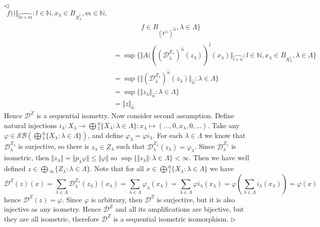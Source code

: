 \documentclass[12pt]{article}
\newenvironment{proof}{\par $\triangleleft$}{$\triangleright$}
\begin{document}
\begin{proof}
$$\begin{aligned}
                f
            )
        )
    \Vert_{\wideparen{l n\times m}}
    :l\in\mathbb{N},x_\lambda\in B_{X_\lambda^{\wideparen{l}}},m\in\mathbb{N},\\
    &\qquad\qquad f\in B_{{(Y^\triangle)}^{\wideparen{m}}},\lambda\in\Lambda
 \} \\
&=\sup \{
    \Vert
        A(
            {(
                {(
                    \mathcal{D}_\lambda^{Z_\lambda}
                )}^{\wideparen{n}}(z_\lambda)
            )}^{\wideparen{l}}(x_\lambda)
    \Vert_{\wideparen{l\times n}}
    : l\in\mathbb{N},x_\lambda\in B_{X_\lambda^{\wideparen{l}}},
    \lambda\in\Lambda
 \} \\
&=\sup \{
    \Vert
        {(\mathcal{D}_\lambda^{Z_\lambda})}^{\wideparen{n}}(z_\lambda)
    \Vert_{\wideparen{n}}
    :\lambda\in\Lambda
 \} \\
&=\sup \{
    \Vert z_\lambda \Vert_{\wideparen{n}}
    :\lambda\in\Lambda
 \} \\
&=\Vert z \Vert_{\wideparen{n}}
\end{aligned}
$$
Hence $\mathcal{D}^Z$ is a sequential isometry. Now consider second assumption. 
Define natural injections 
$i_\lambda
:X_\lambda\to\bigoplus{}_1^0 \{X_\lambda:\lambda\in\Lambda \}
:x_\lambda\mapsto (\ldots,0,x_\lambda,0,\ldots)$. 
Take any 
$\varphi\in\mathcal{SB}(\bigoplus{}_1^0 \{X_\lambda:\lambda\in\Lambda \})$, and 
define $\varphi_\lambda=\varphi i_\lambda$. For each 
$\lambda\in\Lambda$ we know that $\mathcal{D}_\lambda^{Z_\lambda}$ is 
surjective, so there is $z_\lambda\in Z_\lambda$ such 
that $\mathcal{D}_\lambda^{Z_\lambda}(z_\lambda)=\varphi_\lambda$. 
Since $\mathcal{D}_\lambda^{Z_\lambda}$ is isometric, 
then $\Vert z_\lambda\Vert=\Vert p_\lambda\varphi\Vert\leq\Vert \varphi\Vert$ 
so $\sup \{\Vert z_\lambda\Vert:\lambda\in\Lambda \}<\infty$. Then we have well 
defined $z\in\bigoplus{}_\infty \{Z_\lambda:\lambda\in\Lambda \}$. Note that for 
all $x\in \bigoplus{}_1^0 \{X_\lambda:\lambda\in\Lambda \}$ we have
$$
\mathcal{D}^{Z}(z)(x)
=\sum_{\lambda\in\Lambda}\mathcal{D}_\lambda^{Z_\lambda}(z_\lambda)(x_\lambda)
=\sum_{\lambda\in\Lambda}\varphi_\lambda(x_\lambda)
=\sum_{\lambda\in\Lambda}\varphi i_\lambda(x_\lambda)
=\varphi\left(\sum_{\lambda\in\Lambda} i_\lambda(x_\lambda)\right) =\varphi(x)
$$
hence $\mathcal{D}^Z(z)=\varphi$. Since $\varphi$ is arbitrary, 
then $\mathcal{D}^Z$ is surjective, but it is also injective as any isometry. 
Hence $\mathcal{D}^Z$ and all its amplifications are bijective, but they are 
all isometric, therefore $\mathcal{D}^Z$ is a sequential isometric isomorphism.
\end{proof}
\end{document}
